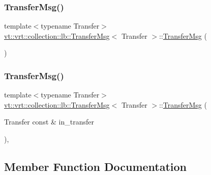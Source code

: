 \subsubsection{\texorpdfstring{Transfer\+Msg()}{TransferMsg()}\hspace{0.1cm}{\footnotesize\ttfamily [1/2]}}
{\footnotesize\ttfamily template$<$typename Transfer$>$ \\
\hyperlink{structvt_1_1vrt_1_1collection_1_1lb_1_1_transfer_msg}{vt\+::vrt\+::collection\+::lb\+::\+Transfer\+Msg}$<$ Transfer $>$\+::\hyperlink{structvt_1_1vrt_1_1collection_1_1lb_1_1_transfer_msg}{Transfer\+Msg} (\begin{DoxyParamCaption}{ }\end{DoxyParamCaption})\hspace{0.3cm}{\ttfamily [default]}}

\mbox{\label{structvt_1_1vrt_1_1collection_1_1lb_1_1_transfer_msg_a3f2753a92fc1d0fa93489b9adf102533}} 
\subsubsection{\texorpdfstring{Transfer\+Msg()}{TransferMsg()}\hspace{0.1cm}{\footnotesize\ttfamily [2/2]}}
{\footnotesize\ttfamily template$<$typename Transfer$>$ \\
\hyperlink{structvt_1_1vrt_1_1collection_1_1lb_1_1_transfer_msg}{vt\+::vrt\+::collection\+::lb\+::\+Transfer\+Msg}$<$ Transfer $>$\+::\hyperlink{structvt_1_1vrt_1_1collection_1_1lb_1_1_transfer_msg}{Transfer\+Msg} (\begin{DoxyParamCaption}\item[{Transfer const \&}]{in\+\_\+transfer }\end{DoxyParamCaption})\hspace{0.3cm}{\ttfamily [inline]}, {\ttfamily [explicit]}}



\subsection{Member Function Documentation}
\mbox{\label{structvt_1_1vrt_1_1collection_1_1lb_1_1_transfer_msg_a9c93bf7d69be7e2bff65999cc4fadf98}} 
